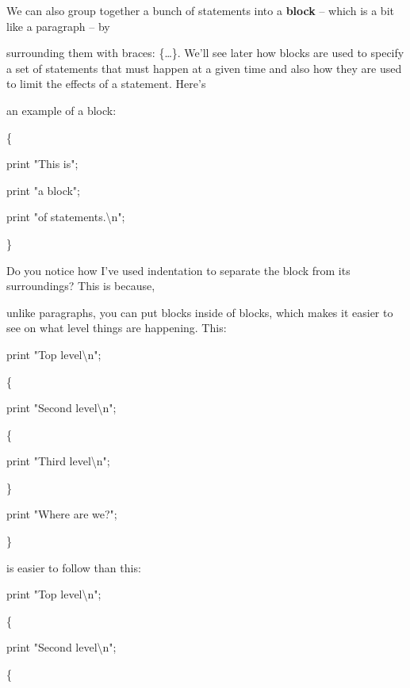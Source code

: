 \documentclass[a4paper,11pt]{book}
\begin{document}
\noindent 

\noindent 

\noindent We can also group together a bunch of statements into a \textbf{block }-- which is a bit like a paragraph -- by

\noindent surrounding them with braces: \{\dots \}. We'll see later how blocks are used to specify a set of statements that must happen at a given time and also how they are used to limit the effects of a statement. Here's

\noindent an example of a block:

\noindent 

\noindent 

\noindent \{

\noindent print "This is";

\noindent print "a block";

\noindent print "of statements.\textbackslash n";

\noindent \}

\noindent 

\noindent Do you notice how I've used indentation to separate the block from its surroundings? This is because,

\noindent unlike paragraphs, you can put blocks inside of blocks, which makes it easier to see on what level things are happening. This:

\noindent 

\noindent 

\noindent print "Top level\textbackslash n";

\noindent \{

\noindent print "Second level\textbackslash n";

\noindent \{

\noindent print "Third level\textbackslash n";

\noindent \}

\noindent print "Where are we?";

\noindent \}

\noindent 

\noindent is easier to follow than this:

\noindent 

\noindent 

\noindent print "Top level\textbackslash n";

\noindent \{

\noindent print "Second level\textbackslash n";

\noindent \{
\end{document}
